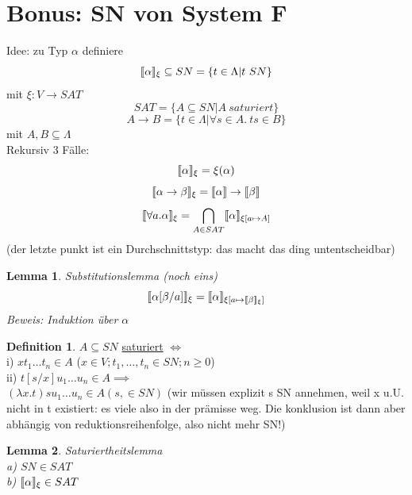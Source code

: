 \documentclass{article}
\newtheorem{lemma}{Lemma}[section]
\theoremstyle{definition}
\newtheorem{definition}{Definition}[section]
\begin{document}
	\section{Bonus: SN von System F}
	Idee: zu Typ $\alpha$ definiere
	\[\llbracket \alpha\rrbracket_{\xi} \subseteq SN = \{t\in \Lambda|t\ SN\}\]
	mit $\xi: V\to SAT$
	\[SAT = \{A\subseteq SN| A\ saturiert\}\]
	\[A\to B = \{t\in\Lambda| \forall s\in A.\ ts\in B\}\]
	mit $A,B\subseteq \Lambda$\\
	Rekursiv 3 Fälle:
	\[\llbracket \alpha\rrbracket_{\xi} =\xi(\alpha)\]
	\[\llbracket \alpha\to\beta\rrbracket_{\xi} = \llbracket \alpha\rrbracket\to\llbracket \beta\rrbracket\]
	\[\llbracket \forall a.\alpha\rrbracket_{\xi} = \bigcap_{A\in SAT}\llbracket \alpha\rrbracket_{\xi[a\mapsto A]}\]
	(der letzte punkt ist ein Durchschnittstyp: das macht das ding untentscheidbar)
	\begin{lemma} Substitutionslemma (noch eins)\\
	\[\llbracket \alpha[\beta/a]\rrbracket_\xi = \llbracket \alpha\rrbracket_{\xi[a\mapsto\llbracket \beta\rrbracket_\xi]}\]
	Beweis: Induktion über $\alpha$
	\end{lemma}
	\begin{definition} $A\subseteq SN$  \underline{saturiert} $\iff$\\
	i) $xt_1\dots t_n\in A$ ($x\in V;t_1,\dots,t_n\in SN;n\geq 0$)\\
	ii) $t[s/x] u_1\dots u_n\in A\implies $\\
	$(\lambda x.t)su_1\dots u_n\in A (s, \in SN)$ (wir müssen explizit s SN annehmen, weil x u.U. nicht in t existiert: es viele also in der prämisse weg. Die konklusion ist dann aber abhängig von reduktionsreihenfolge, also nicht mehr SN!)\\
	\end{definition}
	\begin{lemma} Saturiertheitslemma\\
	a) $SN\in SAT$\\
	b) $\llbracket \alpha\rrbracket_{\xi}\in SAT$\\
	\end{lemma}
\end{document}
